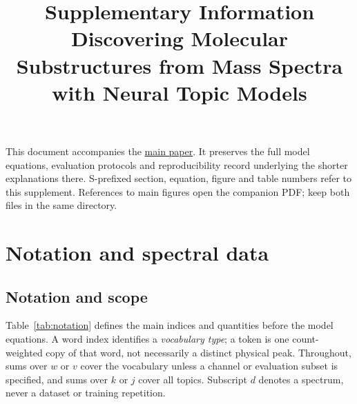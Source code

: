 \documentclass[10pt,a4paper]{article}
\title{Supplementary Information\\[4pt]\large Discovering Molecular Substructures from Mass Spectra\\with Neural Topic Models}
\author{}
\date{}
\begin{document}
\maketitle
This document accompanies the
\href{contextual_sparse_etm_report.pdf}{main paper}. It preserves the full
model equations, evaluation protocols and reproducibility record underlying
the shorter explanations there. S-prefixed section, equation, figure and table
numbers refer to this supplement. References to main figures open the companion
PDF; keep both files in the same directory.
\setcounter{tocdepth}{1}
\tableofcontents
\clearpage
\section{Notation and spectral data}
\label{sec:data}
\subsection{Notation and scope}

Table~\ref{tab:notation} defines the main indices and quantities before the
model equations. A word index identifies a \emph{vocabulary type}; a token is
one count-weighted copy of that word, not necessarily a distinct physical
peak. Throughout, sums over $w$ or $v$ cover the vocabulary unless a channel
or evaluation subset is specified, and sums over $k$ or $j$ cover all topics.
Subscript $d$ denotes a spectrum, never a dataset or training repetition.
\end{document}
